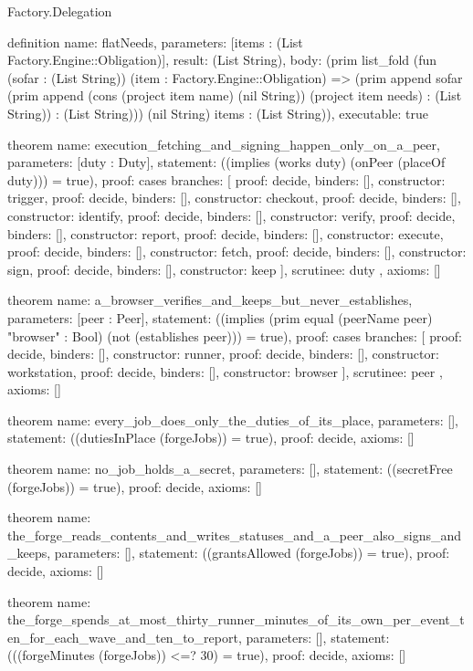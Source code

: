 \begin{lexlean}{Factory.Delegation}
\begin{semanticmodule}
definition{
  name: flatNeeds,
  parameters: [items : (List Factory.Engine::Obligation)],
  result: (List String),
  body: (prim list_fold (fun (sofar : (List String)) (item : Factory.Engine::Obligation) => (prim append sofar (prim append (cons (project item name) (nil String)) (project item needs) : (List String)) : (List String))) (nil String) items : (List String)),
  executable: true
}

theorem{
  name: execution_fetching_and_signing_happen_only_on_a_peer,
  parameters: [duty : Duty],
  statement: ((implies (works duty) (onPeer (placeOf duty))) = true),
  proof: cases{
    branches: [
      {proof: decide{}, binders: [], constructor: trigger},
      {proof: decide{}, binders: [], constructor: checkout},
      {proof: decide{}, binders: [], constructor: identify},
      {proof: decide{}, binders: [], constructor: verify},
      {proof: decide{}, binders: [], constructor: report},
      {proof: decide{}, binders: [], constructor: execute},
      {proof: decide{}, binders: [], constructor: fetch},
      {proof: decide{}, binders: [], constructor: sign},
      {proof: decide{}, binders: [], constructor: keep}
    ],
    scrutinee: duty
  },
  axioms: []
}

theorem{
  name: a_browser_verifies_and_keeps_but_never_establishes,
  parameters: [peer : Peer],
  statement: ((implies (prim equal (peerName peer) "browser" : Bool) (not (establishes peer))) = true),
  proof: cases{
    branches: [
      {proof: decide{}, binders: [], constructor: runner},
      {proof: decide{}, binders: [], constructor: workstation},
      {proof: decide{}, binders: [], constructor: browser}
    ],
    scrutinee: peer
  },
  axioms: []
}

theorem{
  name: every_job_does_only_the_duties_of_its_place,
  parameters: [],
  statement: ((dutiesInPlace (forgeJobs)) = true),
  proof: decide{},
  axioms: []
}

theorem{
  name: no_job_holds_a_secret,
  parameters: [],
  statement: ((secretFree (forgeJobs)) = true),
  proof: decide{},
  axioms: []
}

theorem{
  name: the_forge_reads_contents_and_writes_statuses_and_a_peer_also_signs_and_keeps,
  parameters: [],
  statement: ((grantsAllowed (forgeJobs)) = true),
  proof: decide{},
  axioms: []
}

theorem{
  name: the_forge_spends_at_most_thirty_runner_minutes_of_its_own_per_event_ten_for_each_wave_and_ten_to_report,
  parameters: [],
  statement: (((forgeMinutes (forgeJobs)) <=? 30) = true),
  proof: decide{},
  axioms: []
}


\end{semanticmodule}
\end{lexlean}
